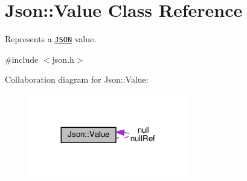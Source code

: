 \hypertarget{class_json_1_1_value}{}\section{Json\+:\+:Value Class Reference}
\label{class_json_1_1_value}


Represents a \href{http://www.json.org}{\tt J\+S\+ON} value.  




{\ttfamily \#include $<$json.\+h$>$}



Collaboration diagram for Json\+:\+:Value\+:
\nopagebreak
\begin{figure}[H]
\begin{center}
\leavevmode
\includegraphics[width=197pt]{class_json_1_1_value__coll__graph}
\end{center}
\end{figure}
